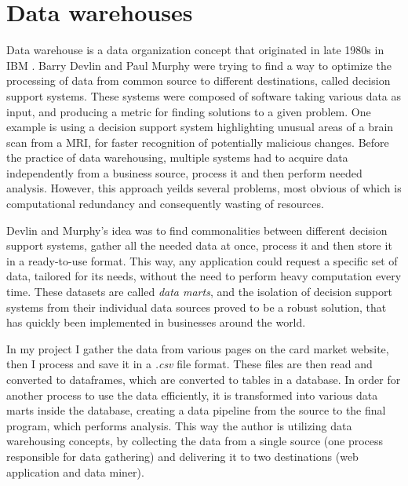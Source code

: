\section{Data warehouses}
Data warehouse is a data organization concept that originated in late 1980s in IBM \cite{dataWarehouses}. Barry Devlin and Paul Murphy were trying to find a way to optimize the processing of data from common source to different destinations, called decision support systems. These systems were composed of software taking various data as input, and producing a metric for finding solutions to a given problem. One example is using a decision support system highlighting unusual areas of a brain scan from a MRI, for faster recognition of potentially malicious changes. Before the practice of data warehousing, multiple systems had to acquire data independently from a business source, process it and then perform needed analysis. However, this approach yeilds several problems, most obvious of which is computational redundancy and consequently wasting of resources. \par
Devlin and Murphy's idea was to find commonalities between different decision support systems, gather all the needed data at once, process it and then store it in a ready-to-use format. This way, any application could request a specific set of data, tailored for its needs, without the need to perform heavy computation every time. These datasets are called \textit{data marts}, and the isolation of decision support systems from their individual data sources proved to be a robust solution, that has quickly been implemented in businesses around the world. \par
In my project I gather the data from various pages on the card market website, then I process and save it in a \textit{.csv} file format. These files are then read and converted to dataframes, which are converted to tables in a database. In order for another process to use the data efficiently, it is transformed into various data marts inside the database, creating a data pipeline from the source to the final program, which performs analysis. This way the author is utilizing data warehousing concepts, by collecting the data from a single source (one process responsible for data gathering) and delivering it to two destinations (web application and data miner).


